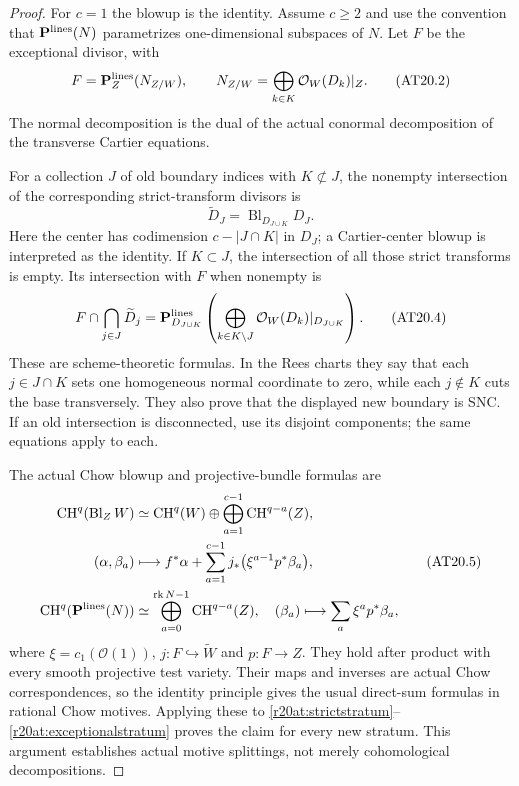\begin{proof}
For $c=1$ the blowup is the identity.  Assume $c\ge2$ and use
the convention that $\mathbf P^{\rm lines}(N)$ parametrizes
one-dimensional subspaces of $N$.  Let $F$ be the exceptional
divisor, with
\[
 F=\mathbf P_Z^{\rm lines}(N_{Z/W}),\qquad
 N_{Z/W}=\bigoplus_{k\in K}\mathcal O_W(D_k)|_Z.
 \tag{AT20.2}\label{r20at:normal}
\]
The normal decomposition is the dual of the actual conormal decomposition of
the transverse Cartier equations.

For a collection $J$ of old boundary indices with $K\not\subset J$,
the nonempty intersection of the corresponding strict-transform
divisors is
\[
 \widetilde D_J
       =\operatorname{Bl}_{D_{J\cup K}}D_J.
 \tag{AT20.3}\label{r20at:strictstratum}
\]
Here the center has codimension $c-|J\cap K|$ in $D_J$;
a Cartier-center blowup is interpreted as the identity.  If
$K\subset J$, the intersection of all those strict transforms
is empty.  Its intersection with $F$ when nonempty is
\[
 F\cap\bigcap_{j\in J}\widetilde D_j
  =\mathbf P_{D_{J\cup K}}^{\rm lines}
       \left(\bigoplus_{k\in K\setminus J}
                   \mathcal O_W(D_k)|_{D_{J\cup K}}\right).
 \tag{AT20.4}\label{r20at:exceptionalstratum}
\]
These are scheme-theoretic formulas.  In the Rees charts they say
that each $j\in J\cap K$ sets one homogeneous normal coordinate
to zero, while each $j\notin K$ cuts the base transversely.
They also prove that the displayed new boundary is SNC.  If an
old intersection is disconnected, use its disjoint components;
the same equations apply to each.

The actual Chow blowup and projective-bundle formulas are
\[
 \begin{split}
 \operatorname{CH}^q(\operatorname{Bl}_Z W)
   &\simeq\operatorname{CH}^q(W)
       \oplus\bigoplus_{a=1}^{c-1}\operatorname{CH}^{q-a}(Z),\\
 (\alpha,\beta_a)&\longmapsto
 f^*\alpha+\sum_{a=1}^{c-1}
        j_*\bigl(\xi^{a-1}p^*\beta_a\bigr),\\
 \operatorname{CH}^q(\mathbf P^{\rm lines}(N))
   &\simeq\bigoplus_{a=0}^{\operatorname{rk}N-1}
                  \operatorname{CH}^{q-a}(Z),\quad
 (\beta_a)\longmapsto\sum_a\xi^a p^*\beta_a,
 \end{split}
 \tag{AT20.5}\label{r20at:chowformula}
\]
where $\xi=c_1(\mathcal O(1))$, $j:F\hookrightarrow\widetilde W$
and $p:F\to Z$.  They hold after product with every smooth
projective test variety.  Their maps and inverses are actual
Chow correspondences, so the identity principle gives the usual
direct-sum formulas in rational Chow motives.  Applying these to
\eqref{r20at:strictstratum}--\eqref{r20at:exceptionalstratum}
proves the claim for every new stratum.  This argument establishes
actual motive splittings, not merely cohomological decompositions.
\end{proof}

